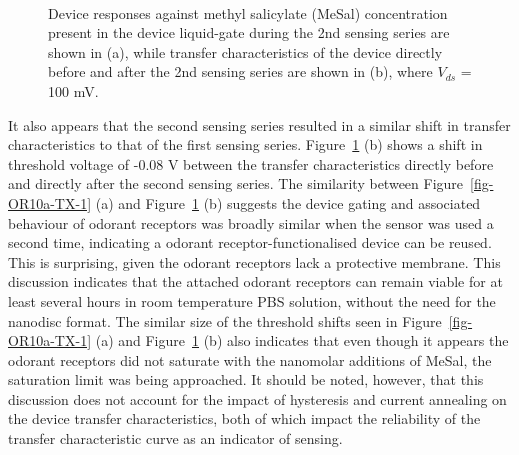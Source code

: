 \documentclass[
  a4paper,
]{scrbook}
\begin{document}
\begin{figure}
\begin{minipage}[t]{0.45\linewidth}
{{}

}

\end{minipage}%
%
\begin{minipage}[t]{0.01\linewidth}

{\centering 

~

}

\end{minipage}%

\caption{\label{fig-OR10a-signal-TX}Device responses against methyl
salicylate (MeSal) concentration present in the device liquid-gate
during the 2nd sensing series are shown in (a), while transfer
characteristics of the device directly before and after the 2nd sensing
series are shown in (b), where \(V_{ds}\) = 100 mV.}

\end{figure}

It also appears that the second sensing series resulted in a similar
shift in transfer characteristics to that of the first sensing series.
Figure~\ref{fig-OR10a-signal-TX} (b) shows a shift in threshold voltage
of -0.08 V between the transfer characteristics directly before and
directly after the second sensing series. The similarity between
Figure~\ref{fig-OR10a-TX-1} (a) and Figure~\ref{fig-OR10a-signal-TX} (b)
suggests the device gating and associated behaviour of odorant receptors
was broadly similar when the sensor was used a second time, indicating a
odorant receptor-functionalised device can be reused. This is
surprising, given the odorant receptors lack a protective membrane. This
discussion indicates that the attached odorant receptors can remain
viable for at least several hours in room temperature PBS solution,
without the need for the nanodisc format. The similar size of the
threshold shifts seen in Figure~\ref{fig-OR10a-TX-1} (a) and
Figure~\ref{fig-OR10a-signal-TX} (b) also indicates that even though it
appears the odorant receptors did not saturate with the nanomolar
additions of MeSal, the saturation limit was being approached. It should
be noted, however, that this discussion does not account for the impact
of hysteresis and current annealing on the device transfer
characteristics, both of which impact the reliability of the transfer
characteristic curve as an indicator of sensing.
\end{document}
